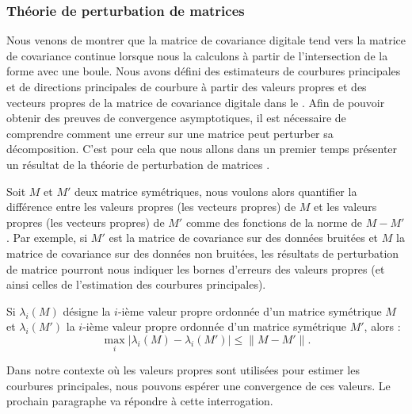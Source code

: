 \subsubsection{Théorie de perturbation de matrices}
%
Nous venons de montrer que la matrice de covariance digitale tend vers la
matrice de covariance continue lorsque nous la calculons à partir de
l'intersection de la forme avec une boule. Nous avons défini des estimateurs de
courbures principales et de directions principales de courbure à partir des
valeurs propres et des vecteurs propres de la matrice de covariance digitale
dans le . Afin de pouvoir obtenir des
preuves de convergence asymptotiques, il est nécessaire de comprendre comment une
erreur sur une matrice peut perturber sa décomposition. C'est pour cela que nous
allons dans un premier temps présenter un résultat de la théorie de perturbation
de matrices \cite{Bauer1960,Stewart1990,Bhatia1997}.


Soit $M$ et $M'$ deux matrice symétriques, nous voulons alors quantifier la
différence entre les valeurs propres (\respp les vecteurs propres) de $M$ et les
valeurs propres (\resp les vecteurs propres) de $M'$ comme des fonctions de la
norme de $M - M'$. Par exemple, si $M'$ est la matrice de covariance sur des
données bruitées et $M$ la matrice de covariance sur des données non bruitées,
les résultats de perturbation de matrice pourront nous indiquer les bornes
d'erreurs des valeurs propres (et ainsi celles de l'estimation des courbures
principales).
%
\begin{theorem}{}
  \label{thm:lidskii-weyl}
  Si $\lambda_i(M)$ désigne la $i$-ième valeur propre ordonnée d'un matrice
  symétrique $M$ et $\lambda_i(M')$ la $i$-ième valeur propre ordonnée d'un matrice
  symétrique $M'$, alors :
  \begin{equation}
    \max_{i}| \lambda_i(M) - \lambda_i(M')| \le \|M-M'\| .
  \end{equation}
\end{theorem}
%
Dans notre contexte où les valeurs propres sont utilisées pour estimer les
courbures principales, nous pouvons espérer une convergence de ces valeurs. Le
prochain paragraphe va répondre à cette interrogation.
%
